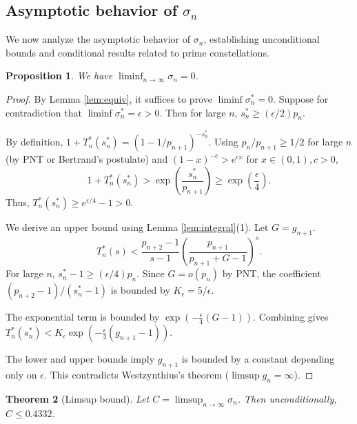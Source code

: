 \documentclass[12pt]{article}
\theoremstyle{plain}
\newtheorem{theorem}{Theorem}
\newtheorem{proposition}[theorem]{Proposition}
\theoremstyle{definition}
\theoremstyle{remark}
\begin{document}
\subsection{Asymptotic behavior of $\sigma_n$}

We now analyze the asymptotic behavior of $\sigma_n$, establishing unconditional bounds and conditional results related to prime constellations.

\begin{proposition}
\label{prop:liminf}
We have $\liminf_{n \to \infty} \sigma_n = 0$.
\end{proposition}

\begin{proof}
By Lemma \ref{lem:equiv}, it suffices to prove $\liminf \sigma_n^* = 0$. Suppose for contradiction that $\liminf \sigma_n^* = \epsilon > 0$. Then for large $n$, $s_n^* \geq (\epsilon/2) p_n$.

By definition, $1 + T_n^*(s_n^*) = (1 - 1/p_{n+1})^{-s_n^*}$.
Using $p_n/p_{n+1} \geq 1/2$ for large $n$ (by PNT or Bertrand's postulate) and $(1-x)^{-c} > e^{cx}$ for $x \in (0,1), c>0$,
\[
1 + T_n^*(s_n^*) > \exp\left(\frac{s_n^*}{p_{n+1}}\right) \geq \exp\left(\frac{\epsilon}{4}\right).
\]
Thus, $T_n^*(s_n^*) \geq e^{\epsilon/4} - 1 > 0$.

We derive an upper bound using Lemma \ref{lem:integral}(1). Let $G = g_{n+1}$.
\[
T_n^*(s) < \frac{p_{n+2}-1}{s-1} \left(\frac{p_{n+1}}{p_{n+1}+G-1}\right)^s.
\]
For large $n$, $s_n^*-1 \geq (\epsilon/4)p_n$. Since $G = o(p_n)$ by PNT, the coefficient $(p_{n+2}-1)/(s_n^*-1)$ is bounded by $K_\epsilon = 5/\epsilon$.

The exponential term is bounded by $\exp(-\frac{\epsilon}{4}(G-1))$.
Combining gives $T_n^*(s_n^*) < K_\epsilon \exp(-\frac{\epsilon}{4}(g_{n+1}-1))$.

The lower and upper bounds imply $g_{n+1}$ is bounded by a constant depending only on $\epsilon$. This contradicts Westzynthius's theorem \cite{Westzynthius1931} ($\limsup g_n = \infty$).
\end{proof}

\begin{theorem}[Limsup bound]
\label{thm:limsup}
Let $C = \limsup_{n \to \infty} \sigma_n$. Then unconditionally, $C \leq 0.4332$.
\end{theorem}
\end{document}
